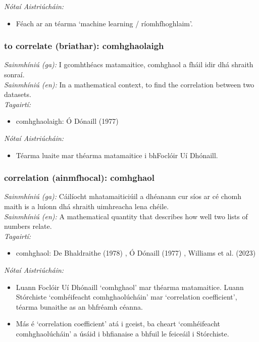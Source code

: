  \noindent \textit{Nótaí Aistriúcháin:}
\begin{itemize}
	\item Féach ar an téarma `machine learning / ríomhfhoghlaim'.
\end{itemize}


\subsubsection*{to correlate (briathar): comhghaolaigh}
 \noindent \textit{Sainmhíniú (ga):} I gcomhthéacs matamaitice, comhghaol a fháil idir dhá shraith sonraí.
\\
 \noindent \textit{Sainmhíniú (en):} In a mathematical context, to find the correlation between two datasets.
\\
 \noindent \textit{Tagairtí:}
\begin{itemize}
	\item comhghaolaigh: Ó Dónaill (1977) \cite{odonaill}
\end{itemize}

 \noindent \textit{Nótaí Aistriúcháin:}
\begin{itemize}
	\item Téarma luaite mar théarma matamaitice i bhFoclóir Uí Dhónaill.
\end{itemize}


\subsubsection*{correlation (ainmfhocal): comhghaol}
 \noindent \textit{Sainmhíniú (ga):} Cáilíocht mhatamaiticiúil a dhéanann cur síos ar cé chomh maith is a luíonn dhá shraith uimhreacha lena chéile.
\\
 \noindent \textit{Sainmhíniú (en):} A mathematical quantity that describes how well two lists of numbers relate.
\\
 \noindent \textit{Tagairtí:}
\begin{itemize}
	\item comhghaol: De Bhaldraithe (1978) \cite{de-bhaldraithe}, Ó Dónaill (1977) \cite{odonaill}, Williams et al. (2023) \cite{storchiste}
\end{itemize}

 \noindent \textit{Nótaí Aistriúcháin:}
\begin{itemize}
	\item Luann Foclóir Uí Dhónaill `comhghaol' mar théarma matamaitice. Luann Stórchiste `comhéifeacht comhghaolúcháin' mar `correlation coefficient', téarma bunaithe as an bhfréamh céanna.
	\item Más é `correlation coefficient' atá i gceist, ba cheart `comhéifeacht comhghaolúcháin' a úsáid i bhfianaise a bhfuil le feiceáil i Stórchiste.
\end{itemize}


